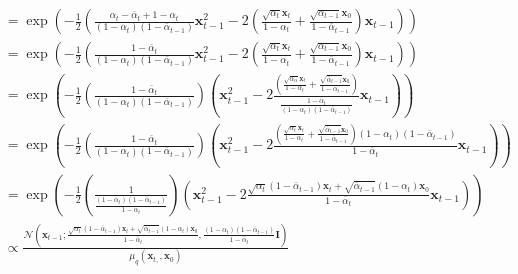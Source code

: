 \begin{align}
                           & =\exp \left(-\frac{1}{2}\left(\frac{\alpha_{t}-\bar{\alpha}_{t}+1-\alpha_{t}}{\left(1-\alpha_{t}\right)\left(1-\bar{\alpha}_{t-1}\right)} \bm{x}_{t-1}^{2}-2\left(\frac{\sqrt{\alpha_{t}} \bm{x}_{t}}{1-\alpha_{t}}+\frac{\sqrt{\alpha_{t-1}} \bm{x}_{0}}{1-\bar{\alpha}_{t-1}}\right) \bm{x}_{t-1}\right)\right)                                                                                                 \\
                           & =\exp \left(-\frac{1}{2}\left(\frac{1-\bar{\alpha}_{t}}{\left(1-\alpha_{t}\right)\left(1-\bar{\alpha}_{t-1}\right)} \bm{x}_{t-1}^{2}-2\left(\frac{\sqrt{\alpha_{t}} \bm{x}_{t}}{1-\alpha_{t}}+\frac{\sqrt{\alpha_{t-1}} \bm{x}_{0}}{1-\bar{\alpha}_{t-1}}\right) \bm{x}_{t-1}\right)\right)                                                                                                                       \\
                           & =\exp \left(-\frac{1}{2}\left(\frac{1-\bar{\alpha}_{t}}{\left(1-\alpha_{t}\right)\left(1-\bar{\alpha}_{t-1}\right)}\right)\left(\bm{x}_{t-1}^{2}-2 \frac{\left(\frac{\sqrt{\alpha_{\alpha}} \bm{x}_{t}}{1-\alpha_{t}}+\frac{\sqrt{\bar{\alpha}_{t-1}} \bm{x}_{0}}{1-\bar{\alpha}_{t-1}}\right)}{\frac{1-\bar{\alpha}_{t}}{\left(1-\alpha_{t}\right)\left(1-\bar{\alpha}_{t-1}\right)}} \bm{x}_{t-1}\right)\right) \\
                           & =\exp \left(-\frac{1}{2}\left(\frac{1-\bar{\alpha}_{t}}{\left(1-\alpha_{t}\right)\left(1-\bar{\alpha}_{t-1}\right)}\right)\left(\bm{x}_{t-1}^{2}-2 \frac{\left(\frac{\sqrt{\alpha_{t}} \bm{x}_{t}}{1-\alpha_{t}}+\frac{\sqrt{\bar{\alpha}_{t-1}} \bm{x}_{0}}{1-\bar{\alpha}_{t-1}}\right)\left(1-\alpha_{t}\right)\left(1-\bar{\alpha}_{t-1}\right)}{1-\bar{\alpha}_{t}} \bm{x}_{t-1}\right)\right)               \\
                           & =\exp \left(-\frac{1}{2}\left(\frac{1}{\frac{\left(1-\alpha_{t}\right)\left(1-\bar{\alpha}_{t-1}\right)}{1-\bar{\alpha}_{t}}}\right)\left(\bm{x}_{t-1}^{2}-2 \frac{\sqrt{\alpha_{t}}\left(1-\bar{\alpha}_{t-1}\right) \bm{x}_{t}+\sqrt{\bar{\alpha}_{t-1}}\left(1-\alpha_{t}\right) \bm{x}_{0}}{1-\bar{\alpha}_{t}} \bm{x}_{t-1}\right)\right)                                                                    \\
                           & \propto \frac{\mathcal{N}\left(\bm{x}_{t-1} ; \frac{\sqrt{\alpha_{t}}\left(1-\bar{\alpha}_{t-1}\right) \bm{x}_{t}+\sqrt{\bar{\alpha}_{t-1}}\left(1-\alpha_{t}\right) \bm{x}_{0}}{1-\bar{\alpha}_{t}}, \frac{\left(1-\alpha_{t}\right)\left(1-\bar{\alpha}_{t-1}\right)}{1-\bar{\alpha}_{t}} \mathbf{I}\right)}{\mu_{q}\left(\bm{x}_{t,}, \bm{x}_{0}\right)}
\end{align}

